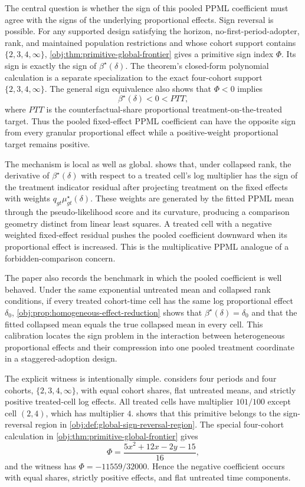 The central question is whether the sign of this pooled PPML coefficient must agree with the signs of the underlying proportional effects. Sign reversal is possible. For any supported design satisfying the horizon, no-first-period-adopter, rank, and maintained population restrictions and whose cohort support contains \(\{2,3,4,\infty\}\), \cref{obj:thm:primitive-global-frontier} gives a primitive sign index \(\Phi\). Its sign is exactly the sign of \(\beta^\star(\delta)\). The theorem's closed-form polynomial calculation is a separate specialization to the exact four-cohort support \(\{2,3,4,\infty\}\). The general sign equivalence also shows that \(\Phi<0\) implies
\[
\beta^\star(\delta)<0<PTT,
\]
where \(PTT\) is the counterfactual-share proportional treatment-on-the-treated target. Thus the pooled fixed-effect PPML coefficient can have the opposite sign from every granular proportional effect while a positive-weight proportional target remains positive.

The mechanism is local as well as global.  shows that, under collapsed rank, the derivative of \(\beta^\star(\delta)\) with respect to a treated cell's log multiplier has the sign of the treatment indicator residual after projecting treatment on the fixed effects with weights \(q_{gt}\mu^\star_{gt}(\delta)\). These weights are generated by the fitted PPML mean through the pseudo-likelihood score and its curvature, producing a comparison geometry distinct from linear least squares. A treated cell with a negative weighted fixed-effect residual pushes the pooled coefficient downward when its proportional effect is increased. This is the multiplicative PPML analogue of a forbidden-comparison concern.

The paper also records the benchmark in which the pooled coefficient is well behaved. Under the same exponential untreated mean and collapsed rank conditions, if every treated cohort-time cell has the same log proportional effect \(\delta_0\), \cref{obj:prop:homogeneous-effect-reduction} shows that \(\beta^\star(\delta)=\delta_0\) and that the fitted collapsed mean equals the true collapsed mean in every cell. This calibration locates the sign problem in the interaction between heterogeneous proportional effects and their compression into one pooled treatment coordinate in a staggered-adoption design.

The explicit witness is intentionally simple.  considers four periods and four cohorts, \(\{2,3,4,\infty\}\), with equal cohort shares, flat untreated means, and strictly positive treated-cell log effects. All treated cells have multiplier \(101/100\) except cell \((2,4)\), which has multiplier \(4\).  shows that this primitive belongs to the sign-reversal region in \cref{obj:def:global-sign-reversal-region}. The special four-cohort calculation in \cref{obj:thm:primitive-global-frontier} gives
\[
\Phi=\frac{5x^2+12x-2y-15}{16},
\]
and the witness has \(\Phi=-11559/32000\). Hence the negative coefficient occurs with equal shares, strictly positive effects, and flat untreated time components.

